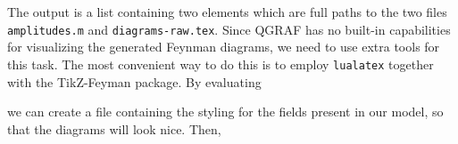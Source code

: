 \documentclass[../FeynHelpersManual.tex]{subfiles}
\begin{document}
\begin{Shaded}
\begin{Highlighting}[]
\ExtensionTok{=}\OperatorTok{[}\OperatorTok{,\{}\OperatorTok{,}\OperatorTok{\}}\OtherTok{{-}\textgreater{}}\OperatorTok{\{}\OperatorTok{,}\OperatorTok{\},}\OtherTok{{-}\textgreater{}}\OperatorTok{,}
\OtherTok{{-}\textgreater{}}\OperatorTok{,}\OtherTok{{-}\textgreater{}}\OperatorTok{\{}\OperatorTok{,}\OperatorTok{\},}
\OtherTok{{-}\textgreater{}}\OperatorTok{[\{}\OperatorTok{,}\OperatorTok{,}\OperatorTok{\}]]}\NormalTok{;}
\end{Highlighting}
\end{Shaded}

The output is a list containing two elements which are full paths to the
two files \texttt{amplitudes.m} and \texttt{diagrams-raw.tex}. Since
QGRAF has no built-in capabilities for visualizing the generated Feynman
diagrams, we need to use extra tools for this task. The most convenient
way to do this is to employ \texttt{lualatex} together with the
TikZ-Feyman package. By evaluating

\begin{Shaded}
\begin{Highlighting}[]
\ExtensionTok{=}\OperatorTok{[}\OperatorTok{,}\OperatorTok{,}
\OtherTok{{-}\textgreater{}}\OperatorTok{\{\{}\OperatorTok{,}\OperatorTok{,}\SpecialCharTok{\textbackslash{}\textbackslash{}}\OperatorTok{\},}
\OperatorTok{\{}\OperatorTok{,}\OperatorTok{,}\OperatorTok{\},}
\OperatorTok{\{}\OperatorTok{,}\OperatorTok{,}\OperatorTok{\}\}]}\NormalTok{;}
\end{Highlighting}
\end{Shaded}

we can create a file containing the styling for the fields present in
our model, so that the diagrams will look nice. Then,
\end{document}
